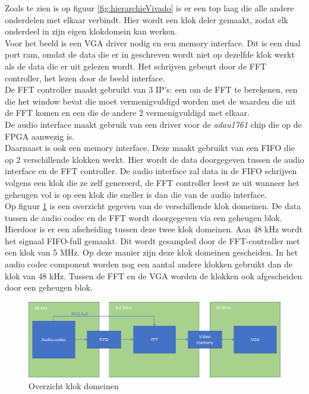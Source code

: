 \documentclass[a4paper,kul]{kulakarticle} %
\begin{document}
Zoals te zien is op figuur \ref{fig:hierarchieVivado} is er een top laag die alle andere onderdelen met elkaar verbindt. Hier wordt een klok deler gemaakt, zodat elk onderdeel in zijn eigen klokdomein kan werken. \\

Voor het beeld is een VGA driver nodig en een memory interface. Dit is een dual port ram, omdat de data die er in geschreven wordt niet op dezelfde klok werkt als de data die er uit gelezen wordt. Het schrijven gebeurt door de FFT controller, het lezen door de beeld interface. \\

De FFT controller maakt gebruikt van 3 IP's: een om de FFT te berekenen, een die het window bevat die moet vermenigvuldigd worden met de waarden die uit de FFT komen en een die de andere 2 vermenigvuldigd met elkaar. \\

De audio interface maakt gebruik van een driver voor de \textit{adau1761} chip die op de FPGA aanwezig is.\\

Daarnaast is ook een memory interface. Deze maakt gebruikt van een FIFO die op 2 verschillende klokken werkt. Hier wordt de data doorgegeven tussen de audio interface en de FFT controller. De audio interface zal data in de FIFO schrijven volgens een klok die ze zelf genereerd, de FFT controller leest ze uit wanneer het geheugen vol is op een klok die sneller is dan die van de audio interface.\\

Op figuur \ref{fig:klok_domeinen} is een overzicht gegeven van de verschillende klok domeinen. De data tussen de audio codec en de FFT wordt doorgegeven via een geheugen blok. Hierdoor is er een afscheiding tussen deze twee klok domeinen. Aan 48 kHz wordt het signaal FIFO-full gemaakt. Dit wordt gesampled door de FFT-controller met een klok van 5 MHz. Op deze manier zijn deze klok domeinen gescheiden. In het audio codec component worden nog een aantal andere klokken gebruikt dan de klok van 48 kHz.
Tussen de FFT en de VGA worden de klokken ook afgescheiden door een geheugen blok.

\begin{figure}[H]
	\centering
	\includegraphics[width=0.7\linewidth]{overzicht_klok_domeinen.png}
	\caption{Overzicht klok domeinen}
	\label{fig:klok_domeinen}
\end{figure}
\end{document}
